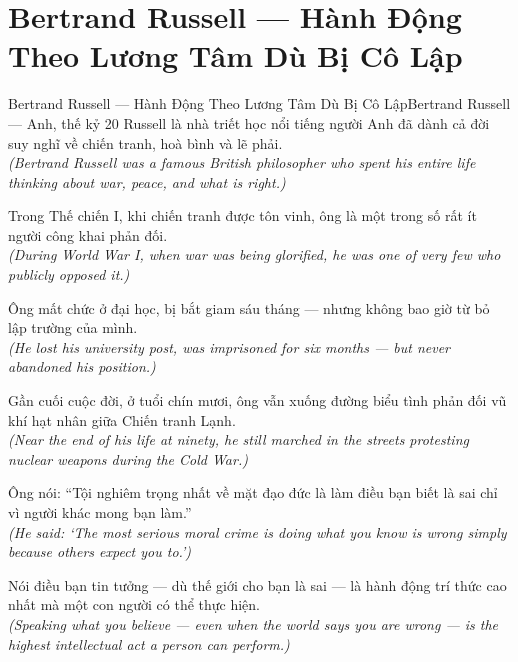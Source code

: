 \section{Bertrand Russell --- Hành Động Theo Lương Tâm Dù Bị Cô Lập}
\begin{truyen}{Bertrand Russell --- Hành Động Theo Lương Tâm Dù Bị Cô Lập}{Bertrand Russell --- Anh, thế kỷ 20}
 Russell là nhà triết học nổi tiếng người Anh đã dành cả đời suy nghĩ về chiến tranh, hoà bình và lẽ phải.\\[4pt]
\textit{(Bertrand Russell was a famous British philosopher who spent his entire life thinking about war, peace, and what is right.)}

Trong Thế chiến I, khi chiến tranh được tôn vinh, ông là một trong số rất ít người công khai phản đối.\\[4pt]
\textit{(During World War I, when war was being glorified, he was one of very few who publicly opposed it.)}

Ông mất chức ở đại học, bị bắt giam sáu tháng --- nhưng không bao giờ từ bỏ lập trường của mình.\\[4pt]
\textit{(He lost his university post, was imprisoned for six months --- but never abandoned his position.)}

Gần cuối cuộc đời, ở tuổi chín mươi, ông vẫn xuống đường biểu tình phản đối vũ khí hạt nhân giữa Chiến tranh Lạnh.\\[4pt]
\textit{(Near the end of his life at ninety, he still marched in the streets protesting nuclear weapons during the Cold War.)}

Ông nói: ``Tội nghiêm trọng nhất về mặt đạo đức là làm điều bạn biết là sai chỉ vì người khác mong bạn làm.''\\[4pt]
\textit{(He said: `The most serious moral crime is doing what you know is wrong simply because others expect you to.')}

\end{truyen}
\begin{baihoc}
  Nói điều bạn tin tưởng --- dù thế giới cho bạn là sai --- là hành động trí thức cao nhất mà một con người có thể thực hiện.\\[4pt]
  \textit{(Speaking what you believe --- even when the world says you are wrong --- is the highest intellectual act a person can perform.)}
\end{baihoc}
